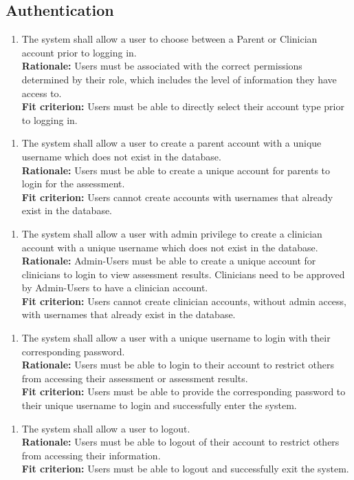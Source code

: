 \documentclass[12pt]{article}
\begin{document}
\subsection{Authentication}
\begin{enumerate}[{FR-A}1. ]
  \item The system shall allow a user to choose between a Parent or Clinician account prior to logging in.\\
  \textbf{Rationale: }Users must be associated with the correct permissions determined by their role, which includes the level of information they have access to.\\
  \textbf{Fit criterion: }Users must be able to directly select their account type prior to logging in. 
\end{enumerate}
\begin{enumerate}[{FR-A}2. ]
  \item The system shall allow a user to create a parent account with a unique username which does not exist in the database.\\
  \textbf{Rationale: }Users must be able to create a unique account for parents to login for the assessment.\\
  \textbf{Fit criterion: }Users cannot create accounts with usernames that already exist in the database.
\end{enumerate}
\begin{enumerate}[{FR-A}3. ]
  \item The system shall allow a user with admin privilege to create a clinician account with a unique username which does not exist in the database.\\
  \textbf{Rationale: }Admin-Users must be able to create a unique account for clinicians to login to view assessment results. Clinicians need to be approved by Admin-Users to have a clinician account.\\
  \textbf{Fit criterion: }Users cannot create clinician accounts, without admin access, with usernames that already exist in the database. 
\end{enumerate}
\begin{enumerate}[{FR-A}4. ]
  \item The system shall allow a user with a unique username to login with their corresponding password.\\
  \textbf{Rationale: }Users must be able to login to their account to restrict others from accessing their assessment or assessment results.\\
  \textbf{Fit criterion: }Users must be able to provide the corresponding password to their unique username to login and successfully enter the system. 
\end{enumerate}
\begin{enumerate}[{FR-A}5. ]
  \item The system shall allow a user to logout.\\
  \textbf{Rationale: }Users must be able to logout of their account to restrict others from accessing their information.\\
  \textbf{Fit criterion: }Users must be able to logout and successfully exit the system.
\end{enumerate}
\end{document}
